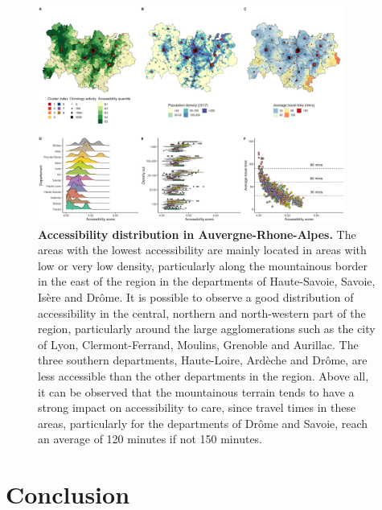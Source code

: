 \begin{figure}[H]
    \includegraphics[width=0.9\textwidth]{images/camion/region_accessibility/accessibility_Auvergne-Rhone-Alpes.png}
    \centering
    \caption{ \textbf{Accessibility distribution in Auvergne-Rhone-Alpes.} The
        areas with the lowest accessibility are mainly located in areas with low
        or very low density, particularly along the mountainous border in the
        east of the region in the departments of Haute-Savoie, Savoie, Isère and
        Drôme. It is possible to observe a good distribution of accessibility in
        the central, northern and north-western part of the region, particularly
        around the large agglomerations such as the city of Lyon,
        Clermont-Ferrand, Moulins, Grenoble and Aurillac. The three southern
        departments, Haute-Loire, Ardèche and Drôme, are less accessible than
        the other departments in the region. Above all, it can be observed that
        the mountainous terrain tends to have a strong impact on accessibility
        to care, since travel times in these areas, particularly for the
        departments of Drôme and Savoie, reach an average of 120 minutes if not
        150 minutes. }
\end{figure}

\section{Conclusion}

